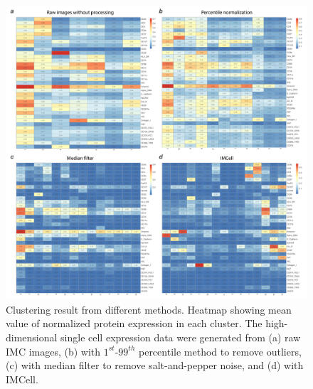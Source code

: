 \documentclass{mynature}
\begin{document}
\begin{figure}[!htb]
  \centering
  \includegraphics[width=\linewidth]{Figure/Figure5.pdf}
  \caption{Clustering result from different methods. Heatmap showing mean value of normalized protein expression in each cluster. The high-dimensional single cell expression data were generated from (a) raw IMC images, (b) with $1^{st}$-$99^{th}$ percentile method to remove outliers, (c) with median filter to remove salt-and-pepper noise, and (d) with IMCell. 
  }
  \label{fig5:cluster}
\end{figure}
\end{document}
